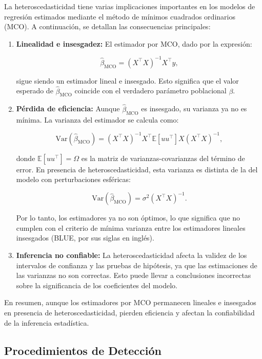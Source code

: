 \documentclass[a4paper,12pt]{article}
\begin{document}
La heteroscedasticidad tiene varias implicaciones importantes en los modelos de regresión estimados mediante el método de mínimos cuadrados ordinarios (MCO). A continuación, se detallan las consecuencias principales:

\begin{enumerate}
    \item \textbf{Linealidad e insesgadez:} 
    El estimador por MCO, dado por la expresión:

    \[
    \hat{\beta}_{\text{MCO}} = (X^\top X)^{-1} X^\top y,
    \]

    sigue siendo un estimador lineal e insesgado. Esto significa que el valor esperado de \(\hat{\beta}_{\text{MCO}}\) coincide con el verdadero parámetro poblacional \(\beta\).

    \item \textbf{Pérdida de eficiencia:} 
    Aunque \(\hat{\beta}_{\text{MCO}}\) es insesgado, su varianza ya no es mínima. La varianza del estimador se calcula como:

    \[
    \text{Var}(\hat{\beta}_{\text{MCO}}) = (X^\top X)^{-1} X^\top \mathbb{E}[u u^\top] X (X^\top X)^{-1},
    \]

    donde \(\mathbb{E}[u u^\top] = \Omega\) es la matriz de varianzas-covarianzas del término de error. En presencia de heteroscedasticidad, esta varianza es distinta de la del modelo con perturbaciones esféricas:

    \[
    \text{Var}(\hat{\beta}_{\text{MCO}}) = \sigma^2 (X^\top X)^{-1}.
    \]

    Por lo tanto, los estimadores ya no son óptimos, lo que significa que no cumplen con el criterio de mínima varianza entre los estimadores lineales insesgados (BLUE, por sus siglas en inglés).

    \item \textbf{Inferencia no confiable:} 
    La heteroscedasticidad afecta la validez de los intervalos de confianza y las pruebas de hipótesis, ya que las estimaciones de las varianzas no son correctas. Esto puede llevar a conclusiones incorrectas sobre la significancia de los coeficientes del modelo.

\end{enumerate}

En resumen, aunque los estimadores por MCO permanecen lineales e insesgados en presencia de heteroscedasticidad, pierden eficiencia y afectan la confiabilidad de la inferencia estadística.

\subsection{Procedimientos de Detección}
\end{document}
